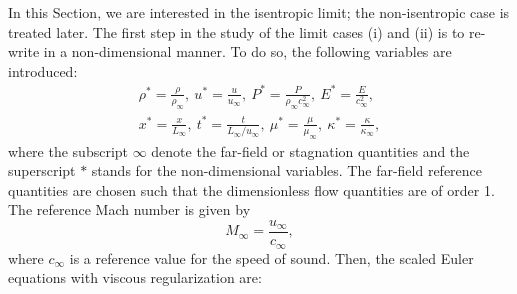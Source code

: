 In this Section, we are interested in the isentropic limit; the non-isentropic case is treated later.
%
The first step in the study of the limit cases (i) and (ii) is to re-write  in a non-dimensional manner. To do so, the following variables are introduced:
%
\begin{multline}
\label{eq:norm_param}
\rho^*   = \frac{\rho}{\rho_\infty}           ,\
u^*      = \frac{u}{u_\infty}                 ,\
P^*      = \frac{P}{\rho_\infty c^2_\infty}   ,\
E^*      = \frac{E}{c^2_\infty }              ,\\
x^* = \frac{x}{L_\infty}                      ,\
t^* = \frac{t}{L_\infty / u_\infty}           ,\ 
\mu^*    = \frac{\mu}{\mu_\infty}             ,\
\kappa^* = \frac{\kappa}{\kappa_\infty}       ,
\end{multline}
%
where  the subscript $\infty$ denote the far-field or stagnation quantities and the superscript $*$ stands for the non-dimensional variables. The far-field reference quantities are chosen such that the dimensionless flow quantities are of order 1. The reference Mach number is given by
%
\begin{equation}
M_\infty = \frac{u_\infty}{c_\infty} ,
\end{equation}
%
where $c_\infty$ is a reference value for the speed of sound. Then, the scaled Euler equations with viscous regularization are:
%
